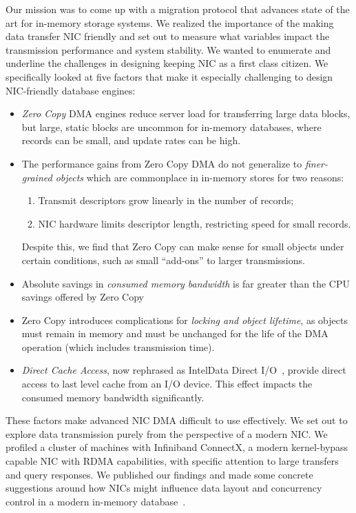 Our mission was to come up with a migration protocol that advances state of the art for in-memory storage systems.
We realized the importance of the making data transfer NIC friendly and set out to measure what variables impact the 
transmission performance and system stability. We wanted to enumerate and underline the challenges in designing keeping NIC as a first class citizen.
We specifically looked at five factors that make it especially challenging to design NIC-friendly
database engines:
\begin{itemize}
  \item {\em Zero Copy} DMA engines reduce server load for transferring large data
    blocks, but large, static blocks are uncommon for in-memory databases,
    where records can be small, and update rates can be high.
  \item The performance gains from Zero Copy DMA do not generalize to
      {\em finer-grained objects} which are commonplace in in-memory stores for two reasons:
      \begin{enumerate}
        \item Transmit descriptors grow linearly in the number of records;
        \item NIC hardware limits descriptor length, restricting speed for small records.
      \end{enumerate}
      Despite this, we find that Zero Copy can make sense for small objects under certain conditions, such as
      small ``add-ons'' to larger transmissions.
   \item Absolute savings in {\em consumed memory bandwidth} is far greater than the CPU savings 
       offered by Zero Copy
   \item Zero Copy introduces complications for \emph{locking and object
      lifetime}, as objects must remain in memory and must be
      unchanged for the life of the DMA operation (which includes transmission
      time).
  \item {\em Direct Cache Access}, now rephrased as Intel\textregistered Data Direct I/O~\cite{ddio},
      provide direct access to last level cache from an I/O device. This effect
      impacts the consumed memory bandwidth significantly.
\end{itemize}


These factors make advanced NIC DMA difficult to use effectively. We set out to explore data 
transmission purely from the perspective of a modern NIC. We profiled a cluster of machines with
Infiniband ConnectX, a modern kernel-bypass capable NIC
with RDMA capabilities, with specific attention to large transfers and query responses.
We published our findings and made some concrete suggestions around how NICs might
influence data layout and concurrency control in a modern in-memory 
database~\cite{imdmpaper}. 


